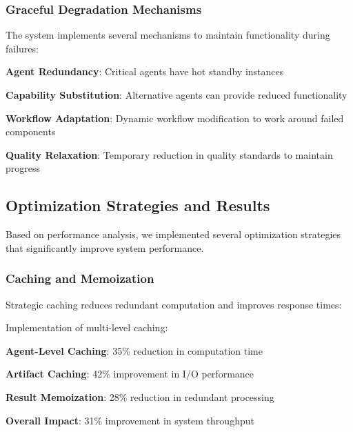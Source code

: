 \subsubsection*{Graceful Degradation Mechanisms}

The system implements several mechanisms to maintain functionality during failures:

\begin{expandedlist}
    \item \textbf{Agent Redundancy}: Critical agents have hot standby instances
    \item \textbf{Capability Substitution}: Alternative agents can provide reduced functionality
    \item \textbf{Workflow Adaptation}: Dynamic workflow modification to work around failed components
    \item \textbf{Quality Relaxation}: Temporary reduction in quality standards to maintain progress
\end{expandedlist}

\subsection*{Optimization Strategies and Results}

Based on performance analysis, we implemented several optimization strategies that significantly improve system performance.

\subsubsection*{Caching and Memoization}

Strategic caching reduces redundant computation and improves response times:

\begin{infobox}[title=Caching Strategy Results]
Implementation of multi-level caching:
\begin{compactlist}
    \item \textbf{Agent-Level Caching}: 35\% reduction in computation time
    \item \textbf{Artifact Caching}: 42\% improvement in I/O performance
    \item \textbf{Result Memoization}: 28\% reduction in redundant processing
    \item \textbf{Overall Impact}: 31\% improvement in system throughput
\end{compactlist}
\end{infobox}

